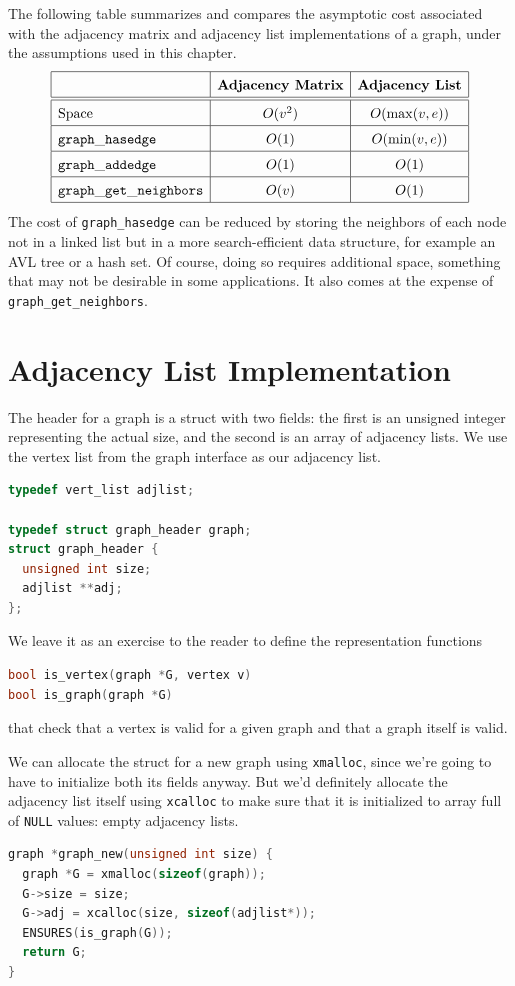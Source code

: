 \bigskip%
The following table summarizes and compares the asymptotic cost
associated with the adjacency matrix and adjacency list
implementations of a graph, under the assumptions used in this
chapter.
$$
\renewcommand{\arraystretch}{1.5}
\begin{array}{|l|c|c|}
\hline
  & \textbf{Adjacency Matrix} & \textbf{Adjacency List}
\\\hline\hline
  \text{Space}                   & O(v^2)       & O(\max(v,e))
\\\hline
  \mathtt{graph\_hasedge}        & O(1)         & O(\min(v,e))
\\\hline
  \mathtt{graph\_addedge}        & O(1)         & O(1)
\\\hline
  \mathtt{graph\_get\_neighbors} & O(v)         & O(1)
\\\hline
\end{array}
$$
The cost of \lstinline'graph_hasedge' can be reduced by storing the
neighbors of each node not in a linked list but in a more
search-efficient data structure, for example an AVL tree or a hash
set.  Of course, doing so requires additional space, something that
may not be desirable in some applications.  It also comes at the
expense of \lstinline'graph_get_neighbors'.


\section{Adjacency List Implementation}
\label{sec:graphs:adjlist_impl}

The header for a graph is a struct with two fields: the first is an
unsigned integer representing the actual size, and the second is an
array of adjacency lists.  We use the vertex list from the graph
interface as our adjacency list.
\begin{lstlisting}[language=c]
typedef vert_list adjlist;

typedef struct graph_header graph;
struct graph_header {
  unsigned int size;
  adjlist **adj;
};
\end{lstlisting}

\noindent
We leave it as an exercise to the reader to define the representation functions
\begin{lstlisting}[language=c]
bool is_vertex(graph *G, vertex v)
bool is_graph(graph *G)
\end{lstlisting}
that check that a vertex is valid for a given graph and that a graph
itself is valid.

We can allocate the struct for a new graph using \lstinline'xmalloc',
since we're going to have to initialize both its fields anyway. But
we'd definitely allocate the adjacency list itself using
\lstinline'xcalloc' to make sure that it is initialized to array full
of \lstinline'NULL' values: empty adjacency lists.
\begin{lstlisting}[language=c]
graph *graph_new(unsigned int size) {
  graph *G = xmalloc(sizeof(graph));
  G->size = size;
  G->adj = xcalloc(size, sizeof(adjlist*));
  ENSURES(is_graph(G));
  return G;
}
\end{lstlisting}

